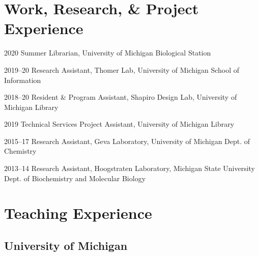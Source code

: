 \documentclass[12pt,letterpaper]{report}
\begin{document}
    \section*{Work, Research, & Project Experience}

    \begin{tablist}
    
        \item[2020] \tab Summer Librarian, University of Michigan Biological Station
    
        \item[2019--20] \tab Research Assistant, Thomer Lab, University of Michigan School of Information
        
        \item[2018--20] \tab Resident & Program Assistant, Shapiro Design Lab, University of Michigan Library
    
        \item[2019] \tab Technical Services Project Assistant, University of Michigan Library

        \item[2015--17] \tab Research Assistant, Geva Laboratory, University of Michigan Dept. of Chemistry

        \item[2013--14] \tab Research Assistant, Hoogstraten Laboratory, Michigan State University Dept. of Biochemistry and Molecular Biology

    \end{tablist}



    \section*{Teaching Experience}

    \subsection*{University of Michigan}
    
\end{document}

